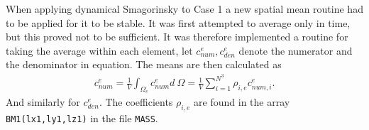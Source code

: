 When applying dynamical Smagorinsky to Case 1 a new spatial mean routine had to be applied for it to be stable. 
It was first attempted to average only in time, but this proved not to be sufficient. It was
therefore implemented a routine for taking the average within each element, let 
$c_{num}^e,c_{den}^e$ denote the numerator and the denominator in equation.
The means are then calculated as 
\begin{align}
    c_{num}^e = \frac{1}{V}\int_{\Omega_e}c_{num}^e d\: \Omega 
    = \frac{1}{V}\sum_{i = 1}^{N^3}\rho_{i,e}c_{num,i}^{e}.
    \label{eq:averageroutine}
\end{align}
And similarly for $c_{den}^e$.
The coefficients $\rho_{i,e}$ are found in the array \verb|BM1(lx1,ly1,lz1)| in the file 
\verb|MASS|.

